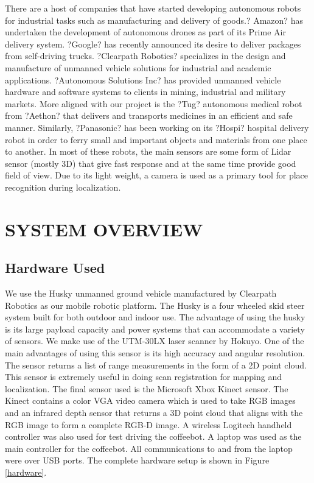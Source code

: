 \documentclass[letterpaper, 10 pt, conference]{ieeeconf}  %
\begin{document}
There are a host of companies that have started developing autonomous robots for industrial tasks such as manufacturing and delivery of goods.? Amazon? has undertaken the development of autonomous drones as part of its Prime Air delivery system. ?Google? has recently announced its desire to deliver packages from self-driving trucks. ?Clearpath Robotics? specializes in the design and manufacture of unmanned vehicle solutions for industrial and academic applications. ?Autonomous Solutions Inc? has provided unmanned vehicle hardware and software systems to clients in mining, industrial and military markets. More aligned with our project is the ?Tug? autonomous medical robot from ?Aethon? that delivers and transports medicines in an efficient and safe manner. Similarly, ?Panasonic? has been working on its ?Hospi? hospital delivery robot in order to ferry small and important objects and materials from one place to another. In most of these robots, the main sensors are some form of Lidar sensor (mostly 3D) that give fast response and at the same time provide good field of view. Due to its light weight, a camera is used as a primary tool for place recognition during localization.

\section{SYSTEM OVERVIEW}

\subsection{Hardware Used} 

We use the Husky unmanned ground vehicle manufactured by Clearpath Robotics as our mobile robotic platform. The Husky is a four wheeled skid steer system built for both outdoor and indoor use. The advantage of using the husky is its large payload capacity and power systems that can accommodate a variety of sensors. We make use of the UTM-30LX laser scanner by Hokuyo. One of the main advantages of using this sensor is its high accuracy and angular resolution. The sensor returns a list of range measurements in the form of a 2D point cloud. This sensor is extremely useful in doing scan registration for mapping and localization. The final sensor used is the Microsoft Xbox Kinect sensor. The Kinect contains a color VGA video camera which is used to take RGB images and an infrared depth sensor that returns a 3D point cloud that aligns with the RGB image to form a complete RGB-D image. A wireless Logitech handheld controller was also used for test driving the coffeebot. A laptop was used as the main controller for the coffeebot. All communications to and from the laptop were over USB ports. The complete hardware setup is shown in Figure \ref{hardware}. 
\end{document}
